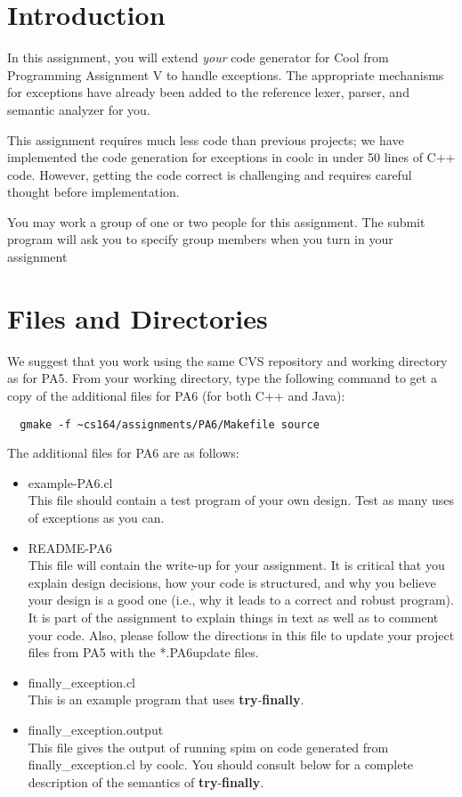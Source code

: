 \documentclass[11pt]{article}
\def\U#1{{\sf{}#1}}
\def\C#1{{\bf{}#1}}
\newcommand{\Try}{\C{try}\xspace}
\newcommand{\Finally}{\C{finally}\xspace}
\begin{document}


\section{Introduction}

In this assignment, you will extend \emph{your} code generator for
Cool from Programming Assignment V to handle exceptions.  The
appropriate mechanisms for exceptions have already been added to the
reference lexer, parser, and semantic analyzer for you.

This assignment requires much less code than previous projects; we
have implemented the code generation for exceptions in \U{coolc} in
under 50 lines of C++ code.  However, getting the code correct is
challenging and requires careful thought before implementation.

You may work a group of one or two people for this assignment. The
\U{submit} program will ask you to specify group members when you turn
in your assignment

\section{Files and Directories}

We suggest that you work using the same CVS repository and working
directory as for PA5.  From your working directory, type the following
command to get a copy of the additional files for PA6 (for both C++
and Java):
\begin{verbatim}
  gmake -f ~cs164/assignments/PA6/Makefile source
\end{verbatim}
The additional files for PA6 are as follows:
\begin{itemize}
\item \U{example-PA6.cl} \\
This file should contain a test program of your own design.  Test as
many uses of exceptions as you can.

\item \U{README-PA6}\\
This file will contain the write-up for your assignment. 
It is critical that you explain design decisions, how your
code is structured, and why you believe your design is a good one
(i.e., why it leads to a correct and robust program).  It is part of
the assignment to explain things in text as well as to comment your
code.  Also, please follow the directions in this file to update 
your project files from PA5 with the \U{*.PA6update} files.

\item \U{finally\_exception.cl} \\
This is an example program that uses \Try-\Finally.

\item \U{finally\_exception.output} \\
This file gives the output of running \U{spim} on code generated from
\U{finally\_exception.cl} by \U{coolc}.  You should consult below for a
complete description of the semantics of \Try-\Finally.
\end{itemize}
\end{document}
